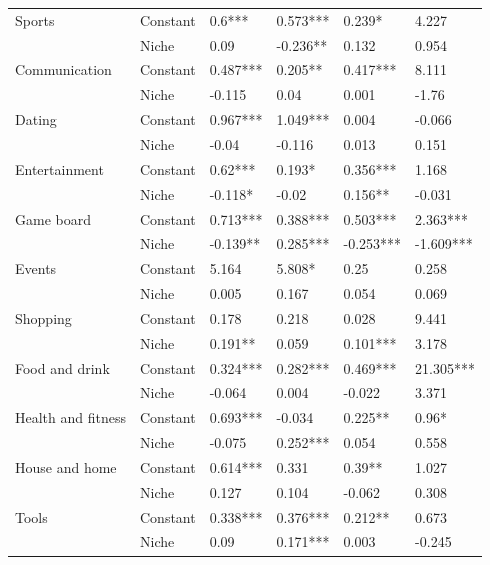 \begin{table}[h!]
\begin{tabular}{llllll}
\cline{1-6}
\multirow{2}{*}{Sports} & Constant &  0.6*** &  0.573*** &  0.239* &  4.227 \\
          & Niche &  0.09 &  -0.236** &  0.132 &  0.954 \\
\cline{1-6}
\multirow{2}{*}{Communication} & Constant &  0.487*** &  0.205** &  0.417*** &  8.111 \\
          & Niche &  -0.115 &  0.04 &  0.001 &  -1.76 \\
\cline{1-6}
\multirow{2}{*}{Dating} & Constant &  0.967*** &  1.049*** &  0.004 &  -0.066 \\
          & Niche &  -0.04 &  -0.116 &  0.013 &  0.151 \\
\cline{1-6}
\multirow{2}{*}{Entertainment} & Constant &  0.62*** &  0.193* &  0.356*** &  1.168 \\
          & Niche &  -0.118* &  -0.02 &  0.156** &  -0.031 \\
\cline{1-6}
\multirow{2}{*}{Game board} & Constant &  0.713*** &  0.388*** &  0.503*** &  2.363*** \\
          & Niche &  -0.139** &  0.285*** &  -0.253*** &  -1.609*** \\
\cline{1-6}
\multirow{2}{*}{Events} & Constant &  5.164 &  5.808* &  0.25 &  0.258 \\
          & Niche &  0.005 &  0.167 &  0.054 &  0.069 \\
\cline{1-6}
\multirow{2}{*}{Shopping} & Constant &  0.178 &  0.218 &  0.028 &  9.441 \\
          & Niche &  0.191** &  0.059 &  0.101*** &  3.178 \\
\cline{1-6}
\multirow{2}{*}{Food and drink} & Constant &  0.324*** &  0.282*** &  0.469*** &  21.305*** \\
          & Niche &  -0.064 &  0.004 &  -0.022 &  3.371 \\
\cline{1-6}
\multirow{2}{*}{Health and fitness} & Constant &  0.693*** &  -0.034 &  0.225** &  0.96* \\
          & Niche &  -0.075 &  0.252*** &  0.054 &  0.558 \\
\cline{1-6}
\multirow{2}{*}{House and home} & Constant &  0.614*** &  0.331 &  0.39** &  1.027 \\
          & Niche &  0.127 &  0.104 &  -0.062 &  0.308 \\
\cline{1-6}
\multirow{2}{*}{Tools} & Constant &  0.338*** &  0.376*** &  0.212** &  0.673 \\
          & Niche &  0.09 &  0.171*** &  0.003 &  -0.245 \\

\end{tabular}
\end{table}

